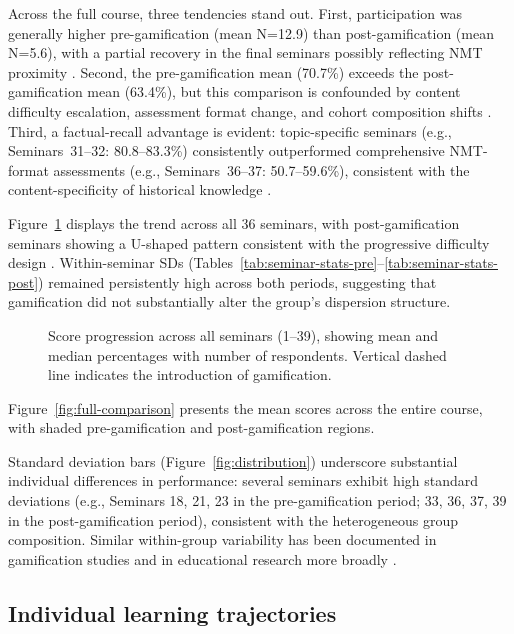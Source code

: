 Across the full course, three tendencies stand out. First, participation was generally higher pre-gamification (mean N=12.9) than post-gamification (mean N=5.6), with a partial recovery in the final seminars possibly reflecting NMT proximity \cite{Hamari2014, KoivistoHamari2019}. Second, the pre-gamification mean (70.7\%) exceeds the post-gamification mean (63.4\%), but this comparison is confounded by content difficulty escalation, assessment format change, and cohort composition shifts \cite{ary, CohenRosenzweig2006, Torgerson202237}. Third, a factual-recall advantage is evident: topic-specific seminars (e.g., Seminars~31--32: 80.8--83.3\%) consistently outperformed comprehensive NMT-format assessments (e.g., Seminars~36--37: 50.7--59.6\%), consistent with the content-specificity of historical knowledge \cite{Wineburg2001, Reisman2012}.

Figure~\ref{fig:progression} displays the trend across all 36 seminars, with post-gamification seminars showing a U-shaped pattern consistent with the progressive difficulty design \cite{KorniienkoSemerikov2024}. Within-seminar SDs (Tables~\ref{tab:seminar-stats-pre}--\ref{tab:seminar-stats-post}) remained persistently high across both periods, suggesting that gamification did not substantially alter the group's dispersion structure.

\begin{figure}[!h]
\centering

\caption{Score progression across all seminars (1--39), showing mean and median percentages with number of respondents. Vertical dashed line indicates the introduction of gamification.}
\label{fig:progression}
\end{figure}

Figure~\ref{fig:full-comparison} presents the mean scores across the entire course, with shaded pre-gamification and post-gamification regions.

Standard deviation bars (Figure~\ref{fig:distribution}) underscore substantial individual differences in performance: several seminars exhibit high standard deviations (e.g., Seminars 18, 21, 23 in the pre-gamification period; 33, 36, 37, 39 in the post-gamification period), consistent with the heterogeneous group composition. Similar within-group variability has been documented in gamification studies \cite{DichevDicheva2017, Sailer2017} and in educational research more broadly \cite{Hattie2009}.

\subsection{Individual learning trajectories}

